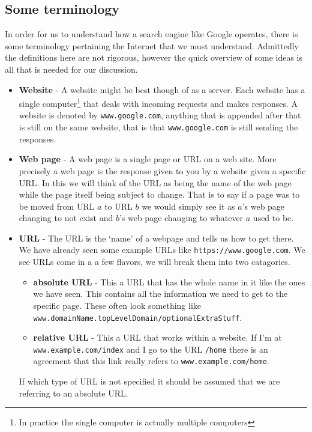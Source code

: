 \documentclass{article}
\begin{document}
	
	\subsection{Some terminology}
	In order for us to understand how a search engine like Google operates, there is some terminology pertaining the Internet that we must understand. Admittedly the definitions here are not rigorous, however the quick overview of some ideas is all that is needed for our discussion.
	\begin{itemize}
		
		\item \textbf{Website} - A website might be best though of as a server. Each website has a single computer\footnote{In practice the single computer is actually multiple computers} that deals with incoming requests and makes responses. A website is denoted by \verb|www.google.com|, anything that is appended after that is still on the same website, that is that \verb|www.google.com| is still sending the responses. 
		
		\item \textbf{Web page} - A web page is a single page or URL on a web site. More precisely a web page is the response given to you by a website given a specific URL. In this we will think of the URL as being the name of the web page while the page itself being subject to change. That is to say if a page was to be moved from  URL $a$ to URL $b$ we would simply see it as $a$'s web page changing to not exist and $b$'s web page changing to whatever $a$ used to be.
		
		\item \textbf{URL} - The URL is the `name' of a webpage and tells us how to get there. We have already seen some example URLs like \verb|https://www.google.com|. We see URLs come in a a few flavors, we will break them into two catagories.
		\begin{itemize}
			\item \textbf{absolute URL} - This a URL that has the whole name in it like the ones we have seen. This contains all the information we need to get to the specific page. These often look something like \verb|www.domainName.topLevelDomain/optionalExtraStuff|.
			\item \textbf{relative URL} - This a URL that works within a website. If I'm at \verb|www.example.com/index| and I go to the URL \verb|/home| there is an agreement that this link really refers to \verb|www.example.com/home|.
		\end{itemize}
		If which type of URL is not specified it should be assumed that we are referring to an absolute URL.
		

\end{itemize}
\end{document}
